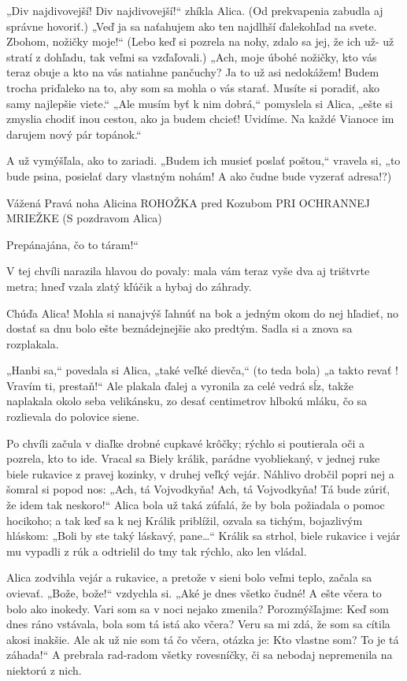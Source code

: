 \documentclass[12pt]{book}
\begin{document}
\begin{Parallel}[p]{}{}
{„Div najdivovejší! Div najdivovejší!“ zhíkla Alica. (Od prekvapenia zabudla aj správne hovoriť.) „Veď ja sa naťahujem ako ten najdlhší ďalekohľad na svete. Zbohom, nožičky moje!“ (Lebo keď si pozrela na nohy, zdalo sa jej, že ich už- už stratí z dohľadu, tak veľmi sa vzďaľovali.) „Ach, moje úbohé nožičky, kto vás teraz obuje a kto na vás natiahne pančuchy? Ja to už asi nedokážem! Budem trocha priďaleko na to, aby som sa mohla o vás starať. Musíte si poradiť, ako samy najlepšie viete.“ „Ale musím byť k nim dobrá,“ pomyslela si Alica, „ešte si zmyslia chodiť inou cestou, ako ja budem chcieť! Uvidíme. Na každé Vianoce im darujem nový pár topánok.“

A už vymýšľala, ako to zariadi. „Budem ich musieť poslať poštou,“ vravela si, „to bude psina, posielať dary vlastným nohám! A ako čudne bude vyzerať adresa!?)

\quad Vážená
\quad Pravá noha Alicina
\quad ROHOŽKA pred Kozubom
\quad PRI OCHRANNEJ MRIEŽKE
\quad (S pozdravom Alica)

Prepánajána, čo to táram!“

V tej chvíli narazila hlavou do povaly: mala vám teraz vyše dva aj trištvrte metra; hneď vzala zlatý kľúčik a hybaj do záhrady.

Chúďa Alica! Mohla si nanajvýš ľahnúť na bok a jedným okom do nej hľadieť, no dostať sa dnu bolo ešte beznádejnejšie ako predtým. Sadla si a znova sa rozplakala.

„Hanbi sa,“ povedala si Alica, „také veľké dievča,“ (to teda bola) „a takto revať ! Vravím ti, prestaň!“ Ale plakala ďalej a vyronila za celé vedrá sĺz, takže naplakala okolo seba velikánsku, zo desať centimetrov hlbokú mláku, čo sa rozlievala do polovice siene.

Po chvíli začula v diaľke drobné cupkavé krôčky; rýchlo si poutierala oči a pozrela, kto to ide. Vracal sa Biely králik, parádne vyobliekaný, v jednej ruke biele rukavice z pravej kozinky, v druhej veľký vejár. Náhlivo drobčil popri nej a šomral si popod nos: „Ach, tá Vojvodkyňa! Ach, tá Vojvodkyňa! Tá bude zúriť, že idem tak neskoro!“ Alica bola už taká zúfalá, že by bola požiadala o pomoc hocikoho; a tak keď sa k nej Králik priblížil, ozvala sa tichým, bojazlivým hláskom: „Boli by ste taký láskavý, pane…“ Králik sa strhol, biele rukavice i vejár mu vypadli z rúk a odtrielil do tmy tak rýchlo, ako len vládal.

Alica zodvihla vejár a rukavice, a pretože v sieni bolo veľmi teplo, začala sa ovievať. „Bože, bože!“ vzdychla si. „Aké je dnes všetko čudné! A ešte včera to bolo ako inokedy. Vari som sa v noci nejako zmenila? Porozmýšľajme: Keď som dnes ráno vstávala, bola som tá istá ako včera? Veru sa mi zdá, že som sa cítila akosi inakšie. Ale ak už nie som tá čo včera, otázka je: Kto vlastne som? To je tá záhada!“ A prebrala rad-radom všetky rovesníčky, či sa nebodaj nepremenila na niektorú z nich.

}
\end{Parallel}
\end{document}
